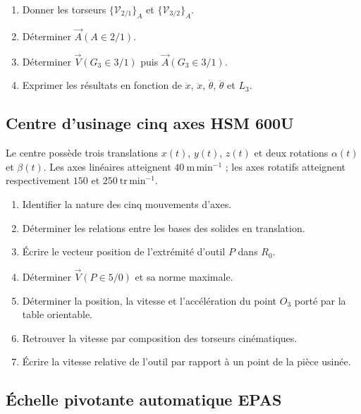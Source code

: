 
\begin{enumerate}
  \item Donner les torseurs $\{\mathcal V_{2/1}\}_A$ et $\{\mathcal V_{3/2}\}_A$.
  \item Déterminer $\vec A(A\in2/1)$.
  \item Déterminer $\vec V(G_3\in3/1)$ puis $\vec A(G_3\in3/1)$.
  \item Exprimer les résultats en fonction de $\dot x$, $\ddot x$, $\dot\theta$, $\ddot\theta$ et $L_3$.
\end{enumerate}

\subsection{Centre d'usinage cinq axes HSM 600U}

Le centre possède trois translations $x(t)$, $y(t)$, $z(t)$ et deux
rotations $\alpha(t)$ et $\beta(t)$. Les axes linéaires atteignent
$40\ \mathrm{m\,min^{-1}}$ ; les axes rotatifs atteignent respectivement
$150$ et $250\ \mathrm{tr\,min^{-1}}$.

\begin{center}
\hfill
{}\hfill
{}
\end{center}

\begin{enumerate}
  \item Identifier la nature des cinq mouvements d'axes.
  \item Déterminer les relations entre les bases des solides en translation.
  \item Écrire le vecteur position de l'extrémité d'outil $P$ dans $R_0$.
  \item Déterminer $\vec V(P\in5/0)$ et sa norme maximale.
  \item Déterminer la position, la vitesse et l'accélération du point $O_3$ porté par la table orientable.
  \item Retrouver la vitesse par composition des torseurs cinématiques.
  \item Écrire la vitesse relative de l'outil par rapport à un point de la pièce usinée.
\end{enumerate}

\subsection{Échelle pivotante automatique EPAS}

